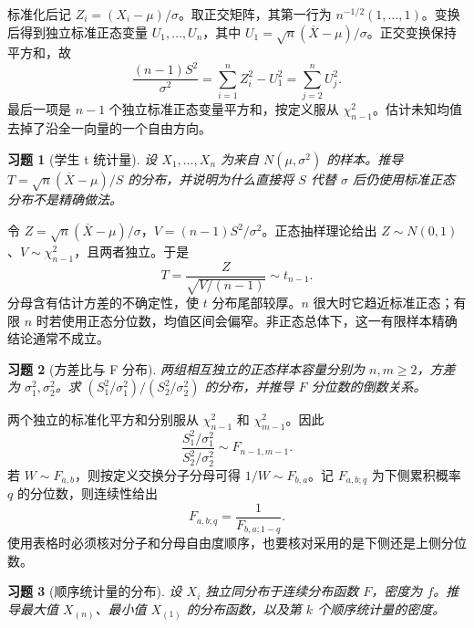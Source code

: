 \documentclass[UTF8,12pt,a4paper,fontset=fandol]{ctexart}
\newtheorem{exercise}{习题}[section]
\begin{document}
\begin{solve}\label{a:B8.4}标准化后记 $Z_i=(X_i-\mu)/\sigma$。取正交矩阵，其第一行为 $n^{-1/2}(1,\ldots,1)$。变换后得到独立标准正态变量 $U_1,\ldots,U_n$，其中 $U_1=\sqrt n(\overline X-\mu)/\sigma$。正交变换保持平方和，故\[\frac{(n-1)S^2}{\sigma^2}=\sum_{i=1}^nZ_i^2-U_1^2=\sum_{j=2}^nU_j^2.\]最后一项是 $n-1$ 个独立标准正态变量平方和，按定义服从 $\chi^2_{n-1}$。估计未知均值去掉了沿全一向量的一个自由方向。\end{solve}

\begin{exercise}[学生 t 统计量]\label{q:B8.5}
设 $X_1,\ldots,X_n$ 为来自 $N(\mu,\sigma^2)$ 的样本。推导 $T=\sqrt n(\overline X-\mu)/S$ 的分布，并说明为什么直接将 $S$ 代替 $\sigma$ 后仍使用标准正态分布不是精确做法。\par{}
\end{exercise}

\begin{solve}\label{a:B8.5}令 $Z=\sqrt n(\overline X-\mu)/\sigma$，$V=(n-1)S^2/\sigma^2$。正态抽样理论给出 $Z\sim N(0,1)$、$V\sim\chi^2_{n-1}$，且两者独立。于是\[T=\frac{Z}{\sqrt{V/(n-1)}}\sim t_{n-1}.\]分母含有估计方差的不确定性，使 $t$ 分布尾部较厚。$n$ 很大时它趋近标准正态；有限 $n$ 时若使用正态分位数，均值区间会偏窄。非正态总体下，这一有限样本精确结论通常不成立。\end{solve}

\begin{exercise}[方差比与 F 分布]\label{q:B8.6}
两组相互独立的正态样本容量分别为 $n,m\ge2$，方差为 $\sigma_1^2,\sigma_2^2$。求 $(S_1^2/\sigma_1^2)/(S_2^2/\sigma_2^2)$ 的分布，并推导 $F$ 分位数的倒数关系。\par{}
\end{exercise}

\begin{solve}\label{a:B8.6}两个独立的标准化平方和分别服从 $\chi^2_{n-1}$ 和 $\chi^2_{m-1}$。因此\[\frac{S_1^2/\sigma_1^2}{S_2^2/\sigma_2^2}\sim F_{n-1,m-1}.\]若 $W\sim F_{a,b}$，则按定义交换分子分母可得 $1/W\sim F_{b,a}$。记 $F_{a,b;q}$ 为下侧累积概率 $q$ 的分位数，则连续性给出\[F_{a,b;q}=\frac{1}{F_{b,a;1-q}}.\]使用表格时必须核对分子和分母自由度顺序，也要核对采用的是下侧还是上侧分位数。\end{solve}

\begin{exercise}[顺序统计量的分布]\label{q:B8.7}
设 $X_i$ 独立同分布于连续分布函数 $F$，密度为 $f$。推导最大值 $X_{(n)}$、最小值 $X_{(1)}$ 的分布函数，以及第 $k$ 个顺序统计量的密度。\par{}
\end{exercise}
\end{document}
